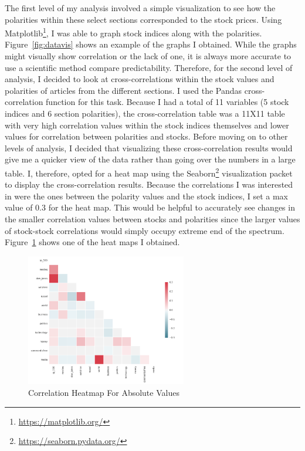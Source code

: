 \documentclass{acm_proc_article-sp}
\begin{document}
The first level of my analysis involved a simple visualization to see how the polarities within these select sections corresponded to the stock prices. Using Matplotlib\footnote{\url{https://matplotlib.org/}}, I was able to graph stock indices along with the polarities. Figure~\ref{fig:datavis} shows an example of the graphs I obtained. 
While the graphs might visually show correlation or the lack of one, it is always more accurate to use a scientific method compare predictability. Therefore, for the second level of analysis, I decided to look at cross-correlations within the stock values and polarities of articles from the different sections. I used the Pandas cross-correlation function for this task. Because I had a total of 11 variables (5 stock indices and 6 section polarities), the cross-correlation table was a 11X11 table with very high correlation values within the stock indices themselves and lower values for correlation between polarities and stocks. Before moving on to other levels of analysis, I decided that visualizing these cross-correlation results would give me a quicker view of the data rather than going over the numbers in a large table. I, therefore, opted for a heat map using the Seaborn\footnote{\url{https://seaborn.pydata.org/}} visualization packet to display the cross-correlation results. Because the correlations I was interested in were the ones between the polarity values and the stock indices, I set a max value of 0.3 for the heat map. This would be helpful to accurately see changes in the smaller correlation values between stocks and polarities since the larger values of stock-stock correlations would simply occupy extreme end of the spectrum. Figure~\ref{fig:corr1} shows one of the heat maps I obtained. 

\begin{figure}[htp]
\includegraphics[width=7cm]{figures/heatmap_pct_change.png}
\caption{Correlation Heatmap For Absolute Values}
\label{fig:corr1}
\end{figure}
\end{document}
